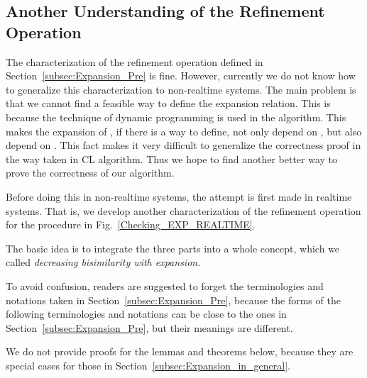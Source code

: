 \documentclass{llncs}
\begin{document}
\subsection{Another Understanding of the Refinement Operation}\label{subsec:Expansion_Another_undestanding}

The characterization of the refinement operation defined in Section~\ref{subsec:Expansion_Pre} is fine. However, currently we do not know how to generalize this characterization to non-realtime systems.  The main problem is that we cannot find a feasible way to define the expansion relation. This is because the technique of dynamic programming is used in the algorithm. This makes the expansion of , if there is a way to define, not only depend on , but also depend on . This fact makes it very difficult to generalize the correctness proof in the way taken in CL algorithm.  Thus we hope to find another better way to prove the correctness of our algorithm.

Before doing this in non-realtime systems,  the attempt is first made in  realtime systems.  That is, we develop another characterization of the refinement operation for the procedure in Fig.~\ref{Checking_EXP_REALTIME}.


The basic idea is to integrate the three parts into a whole concept, which we called {\em decreasing bisimilarity with expansion}.

To avoid confusion, readers are suggested to forget the terminologies and notations taken in Section~\ref{subsec:Expansion_Pre}, because the forms of the following terminologies and  notations can be close to the ones in Section~\ref{subsec:Expansion_Pre}, but their meanings are different.

 We do not provide proofs for the lemmas  and theorems below, because they are special cases for those in Section~\ref{subsec:Expansion_in_general}.
\end{document}
